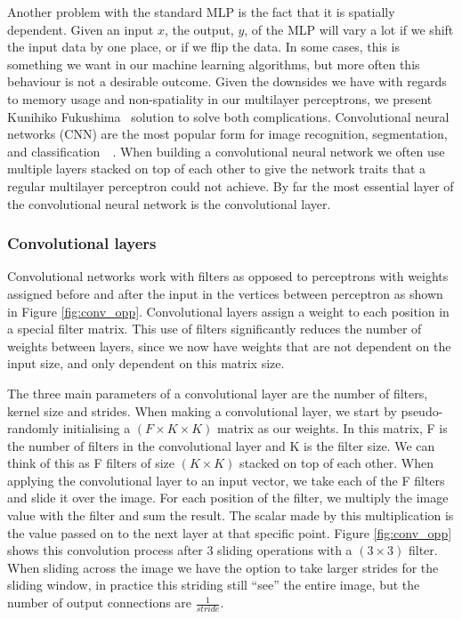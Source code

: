 Another problem with the standard MLP is the fact that it is spatially dependent. Given an input $x$, the output, $y$, of the MLP will vary a lot if we shift the input data by one place, or if we flip the data. In some cases, this is something we want in our machine learning algorithms, but more often this behaviour is not a desirable outcome.
Given the downsides we have with regards to memory usage and non-spatiality in our multilayer perceptrons, we present Kunihiko Fukushima~\cite{Fukushima1980} solution to solve both complications.
Convolutional neural networks (CNN) are the most popular form for image recognition, segmentation, and classification~\cite{NIPS2012_4824}~\cite{Long_2015_CVPR}.
When building a convolutional neural network we often use multiple layers stacked on top of each other to give the network traits that a regular multilayer perceptron could not achieve. By far the most essential layer of the convolutional neural network is the convolutional layer.


\subsubsection{Convolutional layers}

Convolutional networks work with filters as opposed to perceptrons with weights assigned before and after the input in the vertices between perceptron as shown in Figure \ref{fig:conv_opp}. Convolutional layers assign a weight to each position in a special filter matrix. This use of filters significantly reduces the number of weights between layers, since we now have weights that are not dependent on the input size, and only dependent on this matrix size.

The three main parameters of a convolutional layer are the number of filters, kernel size and strides.
When making a convolutional layer, we start by pseudo-randomly initialising a $ (F \times K \times K)$ matrix as our weights.
In this matrix, F is the number of filters in the convolutional layer and K is the filter size. We can think of this as F filters of size $(K \times K)$ stacked on top of each other. 
When applying the convolutional layer to an input vector, we take each of the F filters and slide it over the image. 
For each position of the filter, we multiply the image value with the filter and sum the result. The scalar made by this multiplication is the value passed on to the next layer at that specific point.
Figure \ref{fig:conv_opp} shows this convolution process after 3 sliding operations with a $(3 \times 3)$ filter. When sliding across the image we have the option to take larger strides for the sliding window, in practice this striding still ``see'' the entire image, but the number of output connections are $\frac{1}{stride}$.
 
